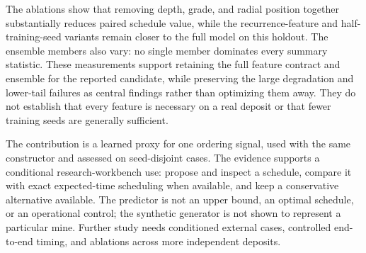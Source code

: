 \documentclass[11pt]{article}
\begin{document}
The ablations show that removing depth, grade, and radial position together substantially reduces paired schedule value, while the recurrence-feature and half-training-seed variants remain closer to the full model on this holdout. The ensemble members also vary: no single member dominates every summary statistic. These measurements support retaining the full feature contract and ensemble for the reported candidate, while preserving the large degradation and lower-tail failures as central findings rather than optimizing them away. They do not establish that every feature is necessary on a real deposit or that fewer training seeds are generally sufficient.

The contribution is a learned proxy for one ordering signal, used with the same constructor and assessed on seed-disjoint cases. The evidence supports a conditional research-workbench use: propose and inspect a schedule, compare it with exact expected-time scheduling when available, and keep a conservative alternative available. The predictor is not an upper bound, an optimal schedule, or an operational control; the synthetic generator is not shown to represent a particular mine. Further study needs conditioned external cases, controlled end-to-end timing, and ablations across more independent deposits.
\end{document}
